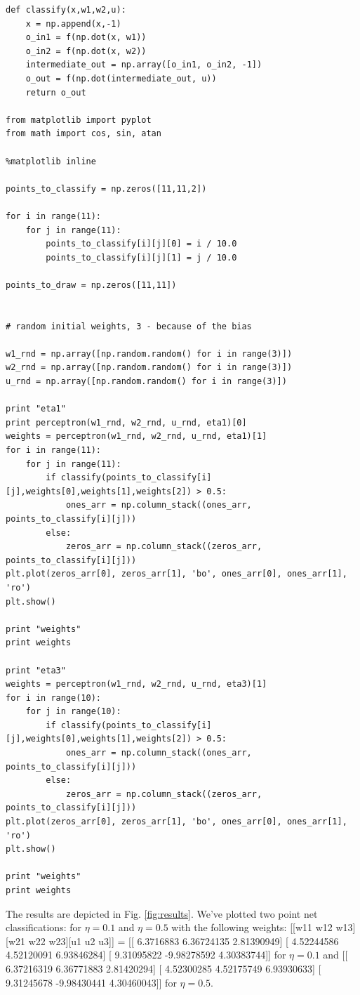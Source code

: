 \documentclass[a4paper, 12pt]{article}
\begin{document}
\lstset{language=Python}
\begin{lstlisting}[frame=single]
def classify(x,w1,w2,u):
    x = np.append(x,-1)
    o_in1 = f(np.dot(x, w1))
    o_in2 = f(np.dot(x, w2))
    intermediate_out = np.array([o_in1, o_in2, -1])
    o_out = f(np.dot(intermediate_out, u))
    return o_out
    
from matplotlib import pyplot
from math import cos, sin, atan

%matplotlib inline

points_to_classify = np.zeros([11,11,2])

for i in range(11):
    for j in range(11):
        points_to_classify[i][j][0] = i / 10.0
        points_to_classify[i][j][1] = j / 10.0

points_to_draw = np.zeros([11,11])


# random initial weights, 3 - because of the bias

w1_rnd = np.array([np.random.random() for i in range(3)])
w2_rnd = np.array([np.random.random() for i in range(3)])
u_rnd = np.array([np.random.random() for i in range(3)])

print "eta1"
print perceptron(w1_rnd, w2_rnd, u_rnd, eta1)[0]
weights = perceptron(w1_rnd, w2_rnd, u_rnd, eta1)[1]
for i in range(11):
    for j in range(11):
        if classify(points_to_classify[i][j],weights[0],weights[1],weights[2]) > 0.5:
            ones_arr = np.column_stack((ones_arr, points_to_classify[i][j]))
        else:
            zeros_arr = np.column_stack((zeros_arr, points_to_classify[i][j]))
plt.plot(zeros_arr[0], zeros_arr[1], 'bo', ones_arr[0], ones_arr[1], 'ro')
plt.show()

print "weights"
print weights

print "eta3"
weights = perceptron(w1_rnd, w2_rnd, u_rnd, eta3)[1]
for i in range(10):
    for j in range(10):
        if classify(points_to_classify[i][j],weights[0],weights[1],weights[2]) > 0.5:
            ones_arr = np.column_stack((ones_arr, points_to_classify[i][j]))
        else:
            zeros_arr = np.column_stack((zeros_arr, points_to_classify[i][j]))
plt.plot(zeros_arr[0], zeros_arr[1], 'bo', ones_arr[0], ones_arr[1], 'ro')
plt.show()

print "weights"
print weights

\end{lstlisting}

The results are depicted in Fig. \ref{fig:results}. We've plotted two point net classifications: for $\eta = 0.1$ and $\eta = 0.5$ with the following weights: [[w11 w12 w13][w21 w22 w23][u1 u2 u3]] = [[ 6.3716883   6.36724135  2.81390949] [ 4.52244586  4.52120091  6.93846284] [ 9.31095822 -9.98278592  4.30383744]] for $\eta = 0.1$ and [[ 6.37216319  6.36771883  2.81420294] [ 4.52300285  4.52175749  6.93930633] [ 9.31245678 -9.98430441  4.30460043]] for $\eta = 0.5$.
\end{document}
